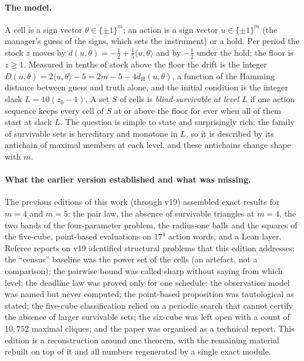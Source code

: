 \documentclass[11pt,a4paper]{article}
\theoremstyle{plain}
\theoremstyle{definition}
\theoremstyle{remark}
\newcommand{\dH}{d_{\mathrm{H}}}
\newcommand{\tfr}[2]{\tfrac{#1}{#2}}
\begin{document}
\paragraph{The model.}
A cell is a sign vector $\theta\in\{\pm1\}^m$; an action is a sign vector $u\in\{\pm1\}^m$ (the manager's guess of the signs, which sets the instrument) or a hold. Per period the stock $z$ moves by $d(u,\theta)=-\tfr12+\tfr15\langle u,\theta\rangle$ and by $-\tfr12$ under the hold; the floor is $z\ge1$. Measured in tenths of stock above the floor the drift is the integer $D(u,\theta)=2\langle u,\theta\rangle-5=2m-5-4\dH(u,\theta)$, a function of the Hamming distance between guess and truth alone, and the initial condition is the integer slack $L=10(z_0-1)$. A set $S$ of cells is \emph{blind-survivable at level $L$} if one action sequence keeps every cell of $S$ at or above the floor for ever when all of them start at slack $L$. The question is simple to state and surprisingly rich: the family of survivable sets is hereditary and monotone in $L$, so it is described by its antichain of maximal members at each level, and these antichains change shape with $m$.

\paragraph{What the earlier version established and what was missing.}
The previous editions of this work (through v19) assembled exact results for $m=4$ and $m=5$: the pair law, the absence of survivable triangles at $m=4$, the two bands of the four-parameter problem, the radius-one balls and the squares of the five-cube, point-based evaluations on $17^4$ action words, and a Lean layer. Referee reports on v19 identified structural problems that this edition addresses: the ``census'' baseline was the power set of the cells (an artefact, not a comparison); the pairwise bound was called sharp without saying from which level; the deadline law was proved only for one schedule; the observation model was named but never computed; the point-based proposition was tautological as stated; the five-cube classification relied on a periodic search that cannot certify the absence of larger survivable sets; the six-cube was left open with a count of $10{,}752$ maximal cliques; and the paper was organised as a technical report. This edition is a reconstruction around one theorem, with the remaining material rebuilt on top of it and all numbers regenerated by a single exact module.
\end{document}
